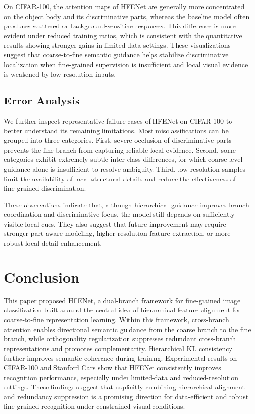 \documentclass[pdflatex,iicol,sn-mathphys-num]{sn-jnl}
\theoremstyle{thmstyleone}%
\theoremstyle{thmstyletwo}%
\theoremstyle{thmstylethree}%
\begin{document}
On CIFAR-100, the attention maps of HFENet are generally more concentrated on the object body and its discriminative parts, whereas the baseline model often produces scattered or background-sensitive responses. 
This difference is more evident under reduced training ratios, which is consistent with the quantitative results showing stronger gains in limited-data settings. 
These visualizations suggest that coarse-to-fine semantic guidance helps stabilize discriminative localization when fine-grained supervision is insufficient and local visual evidence is weakened by low-resolution inputs.


\subsection{Error Analysis}

We further inspect representative failure cases of HFENet on CIFAR-100 to better understand its remaining limitations. 
Most misclassifications can be grouped into three categories. 
First, severe occlusion of discriminative parts prevents the fine branch from capturing reliable local evidence. 
Second, some categories exhibit extremely subtle inter-class differences, for which coarse-level guidance alone is insufficient to resolve ambiguity. 
Third, low-resolution samples limit the availability of local structural details and reduce the effectiveness of fine-grained discrimination.

These observations indicate that, although hierarchical guidance improves branch coordination and discriminative focus, the model still depends on sufficiently visible local cues. 
They also suggest that future improvement may require stronger part-aware modeling, higher-resolution feature extraction, or more robust local detail enhancement.


\section{Conclusion}
\label{sec:conclusion}
This paper proposed HFENet, a dual-branch framework for fine-grained image classification built around the central idea of hierarchical feature alignment for coarse-to-fine representation learning. Within this framework, cross-branch attention enables directional semantic guidance from the coarse branch to the fine branch, while orthogonality regularization suppresses redundant cross-branch representations and promotes complementarity. Hierarchical KL consistency further improves semantic coherence during training. Experimental results on CIFAR-100 and Stanford Cars show that HFENet consistently improves recognition performance, especially under limited-data and reduced-resolution settings. These findings suggest that explicitly combining hierarchical alignment and redundancy suppression is a promising direction for data-efficient and robust fine-grained recognition under constrained visual conditions.
\end{document}
